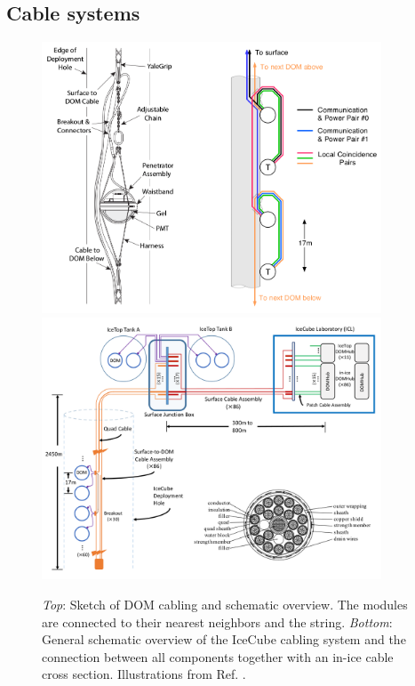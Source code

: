 \subsection{Cable systems}
\label{subsec:cablesystems}
\begin{figure}
\centering
\includegraphics[width=0.9\textwidth]{chapter5/img/cablelayout.png}
\includegraphics[width=0.9\textwidth]{chapter5/img/cableSchematic_withcable.png}
\caption{\textit{Top}: Sketch of DOM cabling and schematic overview. The modules are connected to their nearest neighbors and the string. \textit{Bottom}: General schematic overview of the IceCube cabling system and the connection between all components together with an in-ice cable cross section. Illustrations from Ref. \cite{Aartsen:2016nxy}.}
\label{fig:cable}
\end{figure}

